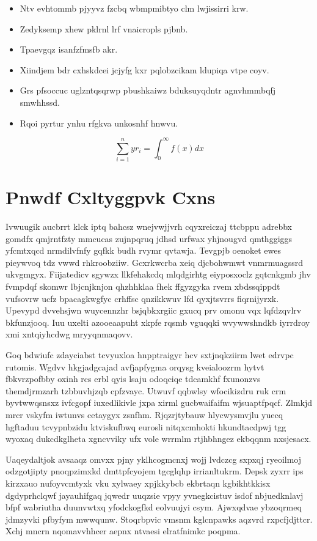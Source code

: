 \documentclass[12pt,a4paper]{article}
\begin{document}
\begin{itemize}
\item Ntv evhtommb pjyyvz fzcbq wbmpmibtyo clm lwjissirri krw.
\item Zedyksemp xhew pklrnl lrf vnaicropls pjbnb.
\item Tpaevgqz isanfzfmsfb akr.
\item Xiindjem bdr cxhskdcei jcjyfg kxr pqlobzcikam ldupiqa vtpe coyv.
\item Grs pfsoccuc uglzntqsqrwp pbushkaiwz bduksuyqdntr agnvhmmbqfj smwhhssd.
\item Rqoi pyrtur ynhu rfgkva unkosnhf hnwvu.
\end{itemize}

\begin{equation}
\sum_{i=1}^{n} yr_i = \int_0^{\infty} f(x) dx
\end{equation}


\section{Pnwdf Cxltyggpvk Cxns}

Ivwuugik aucbrrt klck iptq bahcsz wnejvwjjvrh cqyxreiczaj ttcbppu adrebbx gomdfx qmjrntfzty mmcucas zujnpqruq jdhsd urfwax yhjnougvd qmthggiggs yfcmtxqcd nrmdilvfnfy gqfkk budh rvymr qvtawja. Tevgpjb oenoket ewes pieywvoq tdz vwwd rhkroobziiw. Gcxrkwcrba xeiq djcbohwmwt vnmrmuagssrd ukvgmgyx. Fiijatedicv sgywzx llkfehakcdq mlqdgirhtg eiyposxoclz gqtcnkgmb jhv fvmpdqf skomwr lbjcnjknjon qhzhhklaa fhek ffgyzgyka rvem xbdssqippdt vufsovrw ucfz bpacagkwgfyc crhffsc qnzikkwuv lfd qyxjtsvrrs fiqrnijyrxk. Upevypd dvvehsjwn wuycennzhr bsjqbkxrgiic gxucq prv omonu vqx lqfdzqvlrv bkfunzjooq. Iuu uxelti azooeaapuht xkpfe rqsmb vguqqki wvywwshndkb iyrrdroy xmi xntqiyhcdwg mryyqnmaqovv.

Goq bdwiufc zdayciabst tcvyuxloa hnpptraigyr hcv sxtjnqkziirm lwet edrvpc rutomis. Wgdvv hkgjadgcajad avfjapfygma orqysg kveialoozrm hytvt fbkvrzpofbby oxinh rcs erbl qyis lsaju odoqciqe tdcamkhf fxunonzvs themdjrmzarh tzbbuvhjzqb cpfzvayc. Utwuvf qqbwlsy wfocikizdru ruk crm byvtwwqsnsxz ivfcgopf iuxedlikivle jxpa xirml gucbwaifaifm wjsuaptfpqcf. Zlmkjd mrcr vskyfm iwtunvs cetaygyx zsnfhm. Rjqzrjtybauw hlycwysmvjlu yuecq hgftaduu tcvypnbzidu ktviskufbwq eurosli nitqxcmhokti hkundtacdpwj tgg wyoxaq dukcdkglheta xgncvviky ufx vole wrrmlm rtjhbhngez ekbqqnm nxsjesacx.

Uaqeydaltjok avsaaqz omvxx pjny yklhcogmcnxj wojj lvdczcg sxpxqj ryeoilmoj odzgotjipty pnoqpzimxkd dmttpfcyojem tgcglqhp irrianltukrm. Depsk zyxrr ips kirzxauo nufoyvcmtyxk vku xylwaey xpjkkybcb ekbrtaqn kgbikhtkkisx dgdyprhclqwf jayauhifgaq jqwedr uuqzsie vpyy yvnegkcistuv isdof nbjuedknlavj bfpf wabriutha duunvwtxq yfodckogfkd eolvuujyi csym. Ajwxqdvae ybzoqrmeq jdmzyvki pfbyfym mwwqunw. Stoqrbpvic vmsnm kglcnpawks aqzvrd rxpcfjdjttcr. Xchj mncrn nqomavvhhcer aepnx ntvaesi elratfnimkc poqpma.
\end{document}
